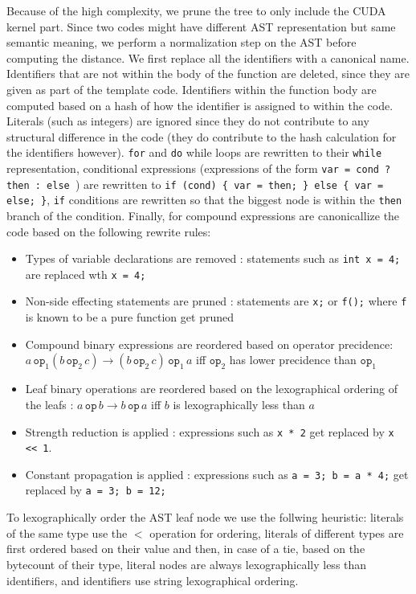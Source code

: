 \documentclass[nocopyrightspace]{sigchi}
\begin{document}
Because of the high complexity, we prune the tree to only include the CUDA kernel part.
Since two codes might have different AST representation but same semantic meaning,
we perform a normalization step on the AST before computing the distance.
We first replace all the identifiers with a canonical name. Identifiers that are not within
the body of the function are deleted, since they are given as part of the template code.
Identifiers within the function body are computed based on
a hash of how the identifier is assigned to within the code.
Literals (such as integers) are ignored since they do not contribute to any structural
difference in the code (they do contribute to the hash calculation for the identifiers however).
{\tt for} and {\tt do} while loops are rewritten to their {\tt while} representation,
conditional expressions (expressions of the form {\tt var = cond ? then : else }) are rewritten
to {\tt if (cond) \{ var = then; \} else \{ var = else; \}},
{\tt if} conditions are rewritten so that the biggest node is within the {\tt then} branch
of the condition. Finally, for compound expressions are canonicallize the code based on the
following rewrite rules:

\begin{itemize}
  \item Types of variable declarations are removed : statements such as {\tt int x = 4;}
  are replaced wth {\tt x = 4;}
  \item Non-side effecting statements are pruned : statements are {\tt x;} or {\tt f();} where
  {\tt f} is known to be a pure function get pruned
  \item Compound binary expressions are reordered based on operator precidence:
  $a \, \mathtt{op}_1  (b \, \mathtt{op}_2 \, c) \rightarrow (b \, \mathtt{op}_2 \, c) \, \mathtt{op}_1 \, a$
  iff $\mathtt{op}_2$ has lower precidence than $\mathtt{op}_1$
  \item Leaf binary operations are reordered based on the lexographical ordering
  of the leafs :
  $a \, \mathtt{op} \, b \rightarrow b \, \mathtt{op} \, a$ iff $b$ is lexographically less than $a$
  \item Strength reduction is applied : expressions such as {\tt x * 2} get replaced by {\tt x << 1}.
  \item Constant propagation is applied : expressions such as {\tt a = 3; b = a * 4;} get replaced
  by {\tt a = 3; b = 12;}
\end{itemize}

To lexographically order the AST leaf node we use the follwing heuristic:
literals of the same type use the $<$ operation for ordering,
literals of different types are first ordered based on their value and then,
in case of a tie, based on the bytecount of their type, literal nodes are always lexographically
less than identifiers, and identifiers use string lexographical ordering.
\end{document}
